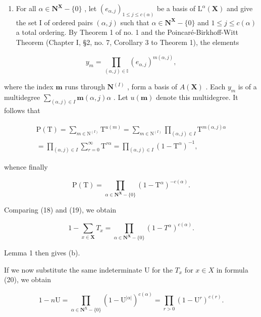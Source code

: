 \begin{enumerate}
\def\labelenumi{(\arabic{enumi})}
\setcounter{enumi}{1}
\tightlist
\item
  For all \(\alpha \in \mathbf{N}^{\mathbf{X}} - \{0\}\) , let \((e_{\alpha,j})_{1 \leqslant j \leqslant c(\alpha)}\) be a basis of \(\mathrm{L}^{\alpha}(\mathbf{X})\) and give the set I of ordered pairs \((\alpha, j)\) such that \(\alpha \in \mathbf{N}^{\mathbf{X}} - \{0\}\) and \(1 \leqslant j \leqslant c(\alpha)\) a total ordering. By Theorem 1 of no. 1 and the Poincaré-Birkhoff-Witt Theorem (Chapter I, §2, no. 7, Corollary 3 to Theorem 1), the elements
\end{enumerate}

\[
y _ {m} = \prod_ {(\alpha , j) \in \mathbb {I}} (e _ {\alpha , j}) ^ {m (\alpha , j)},
\]

where the index \(\pmb{m}\) runs through \(\mathbf{N}^{(I)}\) , form a basis of \(A(\mathbf{X})\) . Each \(y_{m}\) is of a multidegree \(\sum_{(\alpha, j) \in I} \pmb{m}(\alpha, j)\alpha\) . Let \(u(\pmb{m})\) denote this multidegree. It follows that

\[
\begin{array}{l} \mathrm{P(T)} = \sum_ {m \in \mathrm{N} ^ {(I)}} \mathrm{T} ^ {u (m)} = \sum_ {m \in \mathrm{N} ^ {(I)}} \prod_ {(\alpha , j) \in I} \mathrm{T} ^ {m (\alpha , j) \alpha} \\ = \prod_ {(\alpha , j) \in I} \sum_ {r = 0} ^ {\infty} \mathrm{T} ^ {r \alpha} = \prod_ {(\alpha , j) \in I} (1 - \mathrm{T} ^ {\alpha}) ^ {- 1}, \end{array}
\]

whence finally

\[
\mathrm{P} (\mathrm{T}) = \prod_ {\alpha \in \mathbf {N} ^ {\mathbf {X}} - \{0 \}} (1 - \mathrm{T} ^ {\alpha}) ^ {- c (\alpha)}.\tag{19}
\]

Comparing (18) and (19), we obtain

\[
1 - \sum_ {x \in \mathbf {X}} T _ {x} = \prod_ {\alpha \in \mathbf {N} ^ {\mathbf {X}} - \{0\}} (1 - T ^ {\alpha}) ^ {c (\alpha)}.\tag{20}
\]

Lemma 1 then gives (b).

If we now substitute the same indeterminate U for the \(T_{x}\) for \(x \in X\) in formula (20), we obtain

\[
1 - n \mathrm{U} = \prod_ {\alpha \in \mathbf {N} ^ {\mathrm{X}} - \{0\}} (1 - \mathrm{U} ^ {| \alpha |}) ^ {c (\alpha)} = \prod_ {r > 0} (1 - \mathrm{U} ^ {r}) ^ {c (r)}.
\]

